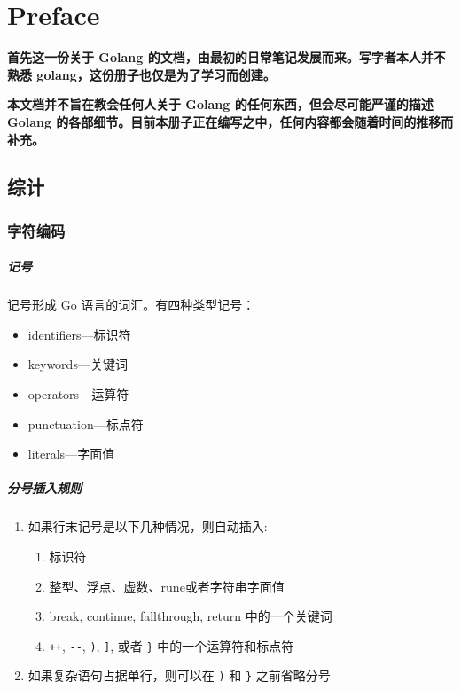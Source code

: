 
\chapter{Preface}
\textbf{首先这一份关于 Golang 的文档，由最初的日常笔记发展而来。写字者本人并不熟悉 golang，这份册子也仅是为了学习而创建。}

\textbf{本文档并不旨在教会任何人关于 Golang 的任何东西，但会尽可能严谨的描述 Golang 的各部细节。目前本册子正在编写之中，任何内容都会随着时间的推移而补充。}

\section{综计}
\subsection{字符编码}

\paragraph{记号}
记号形成 Go 语言的词汇。有四种类型记号：
\begin{itemize}
	\item identifiers---标识符
	\item keywords---关键词
	\item operators---运算符
	\item punctuation---标点符
	\item literals---字面值
\end{itemize}

\paragraph{分号插入规则}
\begin{enumerate}
	\item  如果行末记号是以下几种情况，则自动插入:
	\begin{enumerate}
		\item 标识符
		\item 整型、浮点、虚数、rune或者字符串字面值
		\item  break, continue, fallthrough, return 中的一个关键词
		\item  \verb|++|, \verb|--|, \verb|)|, \verb|]|, 或者 \verb|}| 中的一个运算符和标点符
	\end{enumerate}
	\item  如果复杂语句占据单行，则可以在 \verb|)| 和 \verb|}| 之前省略分号
\end{enumerate}